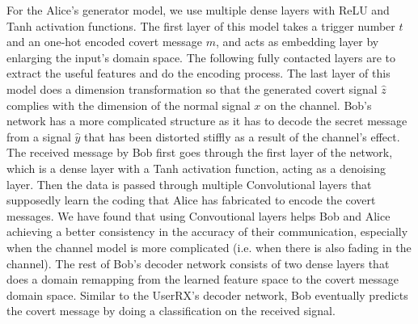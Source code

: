 For the Alice's generator model, we use multiple dense layers with ReLU and Tanh activation functions. The first layer of this model takes a trigger number \(t\) and an one-hot encoded covert message \(m\), and acts as embedding layer by enlarging the input's domain space. The following fully contacted layers are to extract the useful features and do the encoding process. The last layer of this model does a dimension transformation so that the generated covert signal \(\hat{z}\) complies with the dimension of the normal signal \(x\) on the channel. Bob's network has a more complicated structure as it has to decode the secret message from a signal \(\hat{y}\) that has been distorted stiffly as a result of the channel's effect. The received message by Bob first goes through the first layer of the network, which is a dense layer with a Tanh activation function, acting as a denoising layer. Then the data is passed through multiple Convolutional layers that supposedly learn the coding that Alice has fabricated to encode the covert messages. We have found that using Convoutional layers helps Bob and Alice achieving a better consistency in the accuracy of their communication, especially when the channel model is more complicated (i.e. when there is also fading in the channel). The rest of Bob's decoder network consists of two dense layers that does a domain remapping from the learned feature space to the covert message domain space. Similar to the UserRX's decoder network, Bob eventually predicts the covert message by doing a classification on the received signal.
